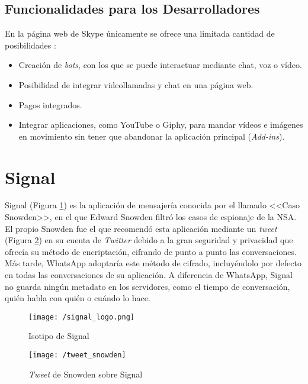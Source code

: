 \newpage

\subsection{Funcionalidades para los Desarrolladores}
En la página web de Skype únicamente se ofrece una limitada cantidad de posibilidades \cite{Skype2017a}:

\begin{itemize}
	\item Creación de \textit{bots}, con los que se puede interactuar mediante chat, voz o vídeo.
	\item Posibilidad de integrar videollamadas y chat en una página web.
	\item Pagos integrados.
	\item Integrar aplicaciones, como YouTube o Giphy, para mandar vídeos e imágenes en movimiento sin tener que abandonar la aplicación principal (\textit{Add-ins}).
\end{itemize}

\section{Signal}
\label{sec:signal}

Signal (Figura \ref{fig:signal}) es la aplicación de mensajería conocida por el llamado <<Caso Snowden>>, en el que Edward Snowden filtró los casos de espionaje de la \acf{NSA}. El propio Snowden fue el que recomendó esta aplicación mediante un \textit{tweet} (Figura \ref{fig:tweetsnowden}) en su cuenta de \textit{Twitter} debido a la gran seguridad y privacidad que ofrecía su método de encriptación, cifrando de punto a punto las conversaciones. Más tarde, WhatsApp adoptaría este método de cifrado, incluyéndolo por defecto en todas las conversaciones de su aplicación. A diferencia de WhatsApp, Signal no guarda ningún metadato en los servidores, como el tiempo de conversación, quién habla con quién o cuándo lo hace.

\begin{figure}[!h]
	\begin{center}
		\texttt{[image: /signal\_logo.png]}
		\caption{Isotipo de Signal}
		\label{fig:signal}
	\end{center}
\end{figure}

\begin{figure}[!h]
	\begin{center}
		\texttt{[image: /tweet\_snowden]}
		\caption{\textit{Tweet} de Snowden sobre Signal}
		\label{fig:tweetsnowden}
	\end{center}
\end{figure}

